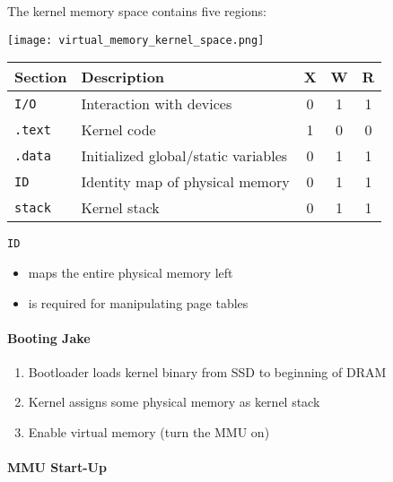 The kernel memory space contains five regions:

\begin{center}
    \texttt{[image: virtual\_memory\_kernel\_space.png]}
\end{center}

\renewcommand{\arraystretch}{1.3}
\setlength{\oldtabcolsep}{\tabcolsep}\setlength\tabcolsep{6pt}

\begin{tabularx}{\linewidth}{@{}lXccc@{}}
    Section        & Description                         & X & W & R \\
    \midrule
    \texttt{I/O}   & Interaction with devices            & 0 & 1 & 1 \\
    \texttt{.text} & Kernel code                         & 1 & 0 & 0 \\
    \texttt{.data} & Initialized global/static variables & 0 & 1 & 1 \\
    \texttt{ID}    & Identity map of physical memory     & 0 & 1 & 1 \\
    \texttt{stack} & Kernel stack                        & 0 & 1 & 1
\end{tabularx}

\newpar{}

\texttt{ID}
\begin{itemize}
    \item maps the entire physical memory left
    \item is required for manipulating page tables
\end{itemize}

\renewcommand{\arraystretch}{1}
\setlength\tabcolsep{\oldtabcolsep}

\paragraph{Booting Jake}
\begin{enumerate}
    \item Bootloader loads kernel binary from SSD to beginning of DRAM
    \item Kernel assigns some physical memory as kernel stack   
    \item Enable virtual memory (turn the MMU on)
\end{enumerate}

\paragraph{MMU Start-Up}

